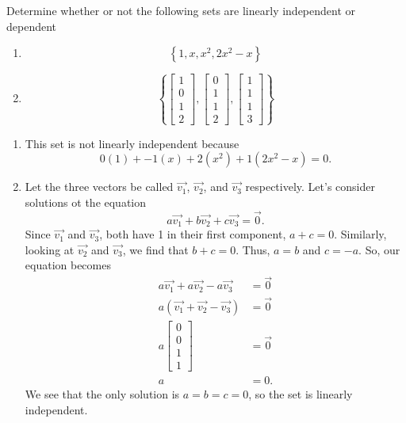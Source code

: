 \begin{example}
	Determine whether or not the following sets are linearly independent or dependent
	\begin{enumerate}
		\item 
		\begin{equation*}
			\left\{1,x,x^2, 2x^2 - x\right\}
		\end{equation*}
		\item
		\begin{equation*}
			\left\{\begin{bmatrix}
				1 \\ 0 \\ 1 \\ 2
			\end{bmatrix}, \begin{bmatrix}
				0 \\ 1 \\ 1 \\ 2
			\end{bmatrix}, \begin{bmatrix}
				1 \\ 1 \\ 1 \\ 3
			\end{bmatrix}\right\}
		\end{equation*}
	\end{enumerate}
\end{example}
\begin{answer}
	\begin{enumerate}
		\item
		This set is not linearly independent because
		\begin{equation*}
			0(1) + -1(x) + 2(x^2) + 1(2x^2 - x) = 0.
		\end{equation*}
		\item
		Let the three vectors be called $\vec{v_1}$, $\vec{v_2}$, and $\vec{v_3}$ respectively.
		Let's consider solutions ot the equation 
		\begin{equation*}
			a\vec{v_1} + b\vec{v_2} + c\vec{v_3} = \vec{0}.
		\end{equation*}
		Since $\vec{v_1}$ and $\vec{v_3}$, both have 1 in their first component, $a+c = 0$.
		Similarly, looking at $\vec{v_2}$ and $\vec{v_3}$, we find that $b+c = 0$.
		Thus, $a = b$ and $c = -a$.
		So, our equation becomes
		\begin{align*}
			a\vec{v_1} + a\vec{v_2} - a\vec{v_3} &= \vec{0} \\
			a\left(\vec{v_1} + \vec{v_2} - \vec{v_3}\right) &= \vec{0} \\
			a\begin{bmatrix}
				0 \\ 0 \\ 1 \\ 1
			\end{bmatrix} &= \vec{0} \\
			a &= 0.
		\end{align*}
		We see that the only solution is $a=b=c=0$, so the set is linearly independent.
	\end{enumerate}
\end{answer}
